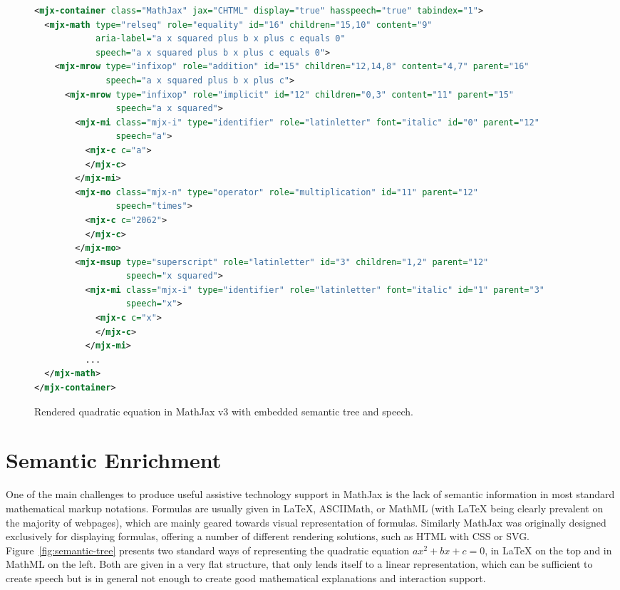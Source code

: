 \documentclass{sig-alternate}
\begin{document}
\begin{figure*}[h!]
  \begin{lstlisting}[language=XML,basicstyle=\scriptsize]
<mjx-container class="MathJax" jax="CHTML" display="true" hasspeech="true" tabindex="1">
  <mjx-math type="relseq" role="equality" id="16" children="15,10" content="9"
            aria-label="a x squared plus b x plus c equals 0" 
            speech="a x squared plus b x plus c equals 0">
    <mjx-mrow type="infixop" role="addition" id="15" children="12,14,8" content="4,7" parent="16"
              speech="a x squared plus b x plus c">
      <mjx-mrow type="infixop" role="implicit" id="12" children="0,3" content="11" parent="15"
                speech="a x squared">
        <mjx-mi class="mjx-i" type="identifier" role="latinletter" font="italic" id="0" parent="12"
                speech="a">
          <mjx-c c="a">
          </mjx-c>
        </mjx-mi>
        <mjx-mo class="mjx-n" type="operator" role="multiplication" id="11" parent="12"
                speech="times">
          <mjx-c c="2062">
          </mjx-c>
        </mjx-mo>
        <mjx-msup type="superscript" role="latinletter" id="3" children="1,2" parent="12"
                  speech="x squared">
          <mjx-mi class="mjx-i" type="identifier" role="latinletter" font="italic" id="1" parent="3" 
                  speech="x">
            <mjx-c c="x">
            </mjx-c>
          </mjx-mi>
          ...
  </mjx-math>
</mjx-container>
\end{lstlisting}
\caption{Rendered quadratic equation in MathJax v3 with embedded
  semantic tree and speech.}
\label{fig:rendered}
\end{figure*}



\section{Semantic Enrichment}
\label{sec:semantic-enrichment}

One of the main challenges to produce useful assistive technology support in
MathJax is the lack of semantic information in most standard mathematical markup
notations. Formulas are usually given in {\LaTeX}, ASCIIMath, or MathML (with
{\LaTeX} being clearly prevalent on the majority of webpages), which are mainly
geared towards visual representation of formulas. Similarly MathJax was
originally designed exclusively for displaying formulas, offering a number of
different rendering solutions, such as HTML with CSS or SVG.
Figure~\ref{fig:semantic-tree} presents two standard ways of representing the
quadratic equation $ax^2 + bx + c = 0$, in {\LaTeX} on the top and in MathML on
the left. Both are given in a very flat structure, that only lends itself to a
linear representation, which can be sufficient to create speech but is in
general not enough to create good mathematical explanations and interaction
support.
\end{document}
